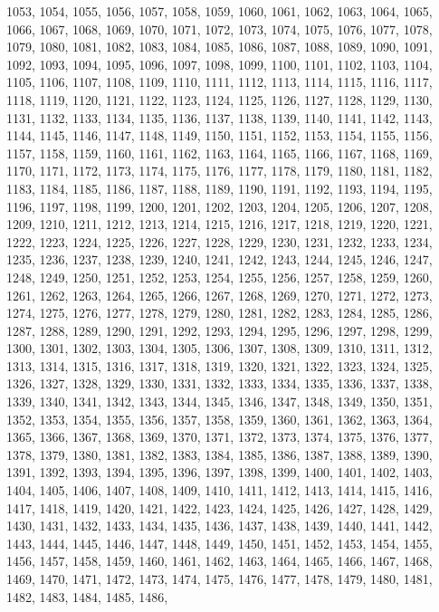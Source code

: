 1053,
1054,
1055,
1056,
1057,
1058,
1059,
1060,
1061,
1062,
1063,
1064,
1065,
1066,
1067,
1068,
1069,
1070,
1071,
1072,
1073,
1074,
1075,
1076,
1077,
1078,
1079,
1080,
1081,
1082,
1083,
1084,
1085,
1086,
1087,
1088,
1089,
1090,
1091,
1092,
1093,
1094,
1095,
1096,
1097,
1098,
1099,
1100,
1101,
1102,
1103,
1104,
1105,
1106,
1107,
1108,
1109,
1110,
1111,
1112,
1113,
1114,
1115,
1116,
1117,
1118,
1119,
1120,
1121,
1122,
1123,
1124,
1125,
1126,
1127,
1128,
1129,
1130,
1131,
1132,
1133,
1134,
1135,
1136,
1137,
1138,
1139,
1140,
1141,
1142,
1143,
1144,
1145,
1146,
1147,
1148,
1149,
1150,
1151,
1152,
1153,
1154,
1155,
1156,
1157,
1158,
1159,
1160,
1161,
1162,
1163,
1164,
1165,
1166,
1167,
1168,
1169,
1170,
1171,
1172,
1173,
1174,
1175,
1176,
1177,
1178,
1179,
1180,
1181,
1182,
1183,
1184,
1185,
1186,
1187,
1188,
1189,
1190,
1191,
1192,
1193,
1194,
1195,
1196,
1197,
1198,
1199,
1200,
1201,
1202,
1203,
1204,
1205,
1206,
1207,
1208,
1209,
1210,
1211,
1212,
1213,
1214,
1215,
1216,
1217,
1218,
1219,
1220,
1221,
1222,
1223,
1224,
1225,
1226,
1227,
1228,
1229,
1230,
1231,
1232,
1233,
1234,
1235,
1236,
1237,
1238,
1239,
1240,
1241,
1242,
1243,
1244,
1245,
1246,
1247,
1248,
1249,
1250,
1251,
1252,
1253,
1254,
1255,
1256,
1257,
1258,
1259,
1260,
1261,
1262,
1263,
1264,
1265,
1266,
1267,
1268,
1269,
1270,
1271,
1272,
1273,
1274,
1275,
1276,
1277,
1278,
1279,
1280,
1281,
1282,
1283,
1284,
1285,
1286,
1287,
1288,
1289,
1290,
1291,
1292,
1293,
1294,
1295,
1296,
1297,
1298,
1299,
1300,
1301,
1302,
1303,
1304,
1305,
1306,
1307,
1308,
1309,
1310,
1311,
1312,
1313,
1314,
1315,
1316,
1317,
1318,
1319,
1320,
1321,
1322,
1323,
1324,
1325,
1326,
1327,
1328,
1329,
1330,
1331,
1332,
1333,
1334,
1335,
1336,
1337,
1338,
1339,
1340,
1341,
1342,
1343,
1344,
1345,
1346,
1347,
1348,
1349,
1350,
1351,
1352,
1353,
1354,
1355,
1356,
1357,
1358,
1359,
1360,
1361,
1362,
1363,
1364,
1365,
1366,
1367,
1368,
1369,
1370,
1371,
1372,
1373,
1374,
1375,
1376,
1377,
1378,
1379,
1380,
1381,
1382,
1383,
1384,
1385,
1386,
1387,
1388,
1389,
1390,
1391,
1392,
1393,
1394,
1395,
1396,
1397,
1398,
1399,
1400,
1401,
1402,
1403,
1404,
1405,
1406,
1407,
1408,
1409,
1410,
1411,
1412,
1413,
1414,
1415,
1416,
1417,
1418,
1419,
1420,
1421,
1422,
1423,
1424,
1425,
1426,
1427,
1428,
1429,
1430,
1431,
1432,
1433,
1434,
1435,
1436,
1437,
1438,
1439,
1440,
1441,
1442,
1443,
1444,
1445,
1446,
1447,
1448,
1449,
1450,
1451,
1452,
1453,
1454,
1455,
1456,
1457,
1458,
1459,
1460,
1461,
1462,
1463,
1464,
1465,
1466,
1467,
1468,
1469,
1470,
1471,
1472,
1473,
1474,
1475,
1476,
1477,
1478,
1479,
1480,
1481,
1482,
1483,
1484,
1485,
1486,
